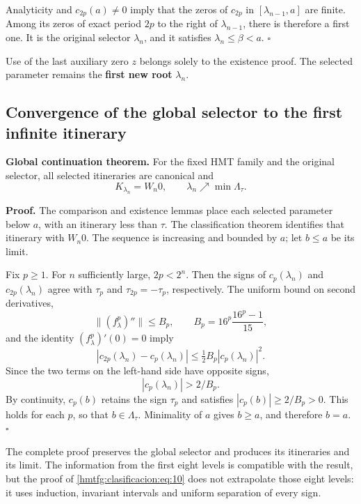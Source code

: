 Analyticity and \(c_{2p}(a)\ne0\) imply that the zeros of \(c_{2p}\) in \([\lambda_{n-1},a]\) are finite. Among its zeros of exact period \(2p\) to the right of \(\lambda_{n-1}\), there is therefore a first one. It is the original selector \(\lambda_n\), and it satisfies \(\lambda_n\le\beta<a\). \(\square\)

Use of the last auxiliary zero \(z\) belongs solely to the existence proof. The selected parameter remains the \textbf{first new root} \(\lambda_n\).


\subsection{Convergence of the global selector to the first infinite itinerary}
\label{hmtfg:clasificacion:5}

\textbf{Global continuation theorem.} For the fixed HMT family and the original selector, all selected itineraries are canonical and
\begin{equation}
\boxed{K_{\lambda_n}=W_n0,\qquad
\lambda_n\nearrow\min\Lambda_\tau.}
\label{hmtfg:clasificacion:eq:10}
\end{equation}

\textbf{Proof.} The comparison and existence lemmas place each selected parameter below \(a\), with an itinerary less than \(\tau\). The classification theorem identifies that itinerary with \(W_n0\). The sequence is increasing and bounded by \(a\); let \(b\le a\) be its limit.

Fix \(p\ge1\). For \(n\) sufficiently large, \(2p<2^n\). Then the signs of \(c_p(\lambda_n)\) and \(c_{2p}(\lambda_n)\) agree with \(\tau_p\) and \(\tau_{2p}=-\tau_p\), respectively. The uniform bound on second derivatives,
\[
\|(f_\lambda^p)''\|\le B_p,
\qquad B_p=16^p\frac{16^p-1}{15},
\]
and the identity \((f_\lambda^p)'(0)=0\) imply
\[
|c_{2p}(\lambda_n)-c_p(\lambda_n)|
\le\tfrac12B_p|c_p(\lambda_n)|^2.
\]
Since the two terms on the left-hand side have opposite signs,
\begin{equation}
|c_p(\lambda_n)|>2/B_p.
\label{hmtfg:clasificacion:eq:11}
\end{equation}
By continuity, \(c_p(b)\) retains the sign \(\tau_p\) and satisfies \(|c_p(b)|\ge2/B_p>0\). This holds for each \(p\), so that \(b\in\Lambda_\tau\). Minimality of \(a\) gives \(b\ge a\), and therefore \(b=a\). \(\square\)

The complete proof preserves the global selector and produces its itineraries and its limit. The information from the first eight levels is compatible with the result, but the proof of \eqref{hmtfg:clasificacion:eq:10} does not extrapolate those eight levels: it uses induction, invariant intervals and uniform separation of every sign.



